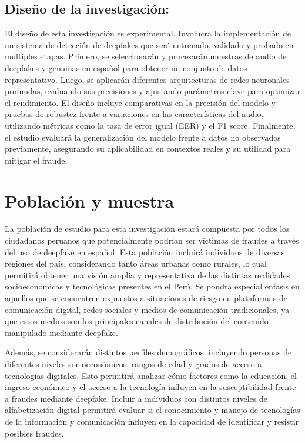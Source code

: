 \subsection{Diseño de la investigación:}
El diseño de esta investigación es experimental. Involucra la implementación de un sistema de detección de deepfakes que será entrenado, validado y probado en múltiples etapas. Primero, se seleccionarán y procesarán muestras de audio de deepfakes y genuinas en español para obtener un conjunto de datos representativo. Luego, se aplicarán diferentes arquitecturas de redes neuronales profundas, evaluando sus precisiones y ajustando parámetros clave para optimizar el rendimiento. El diseño incluye comparativas en la precisión del modelo y pruebas de robustez frente a variaciones en las características del audio, utilizando métricas como la tasa de error igual (EER) y el F1 score. Finalmente, el estudio evaluará la generalización del modelo frente a datos no observados previamente, asegurando su aplicabilidad en contextos reales y su utilidad para mitigar el fraude.

\section{Población y muestra}

La población de estudio para esta investigación estará compuesta por todos los ciudadanos peruanos que potencialmente podrían ser víctimas de fraudes a través del uso de deepfake en español. Esta población incluirá individuos de diversas regiones del país, considerando tanto áreas urbanas como rurales, lo cual permitirá obtener una visión amplia y representativa de las distintas realidades socioeconómicas y tecnológicas presentes en el Perú. Se pondrá especial énfasis en aquellos que se encuentren expuestos a situaciones de riesgo en plataformas de comunicación digital, redes sociales y medios de comunicación tradicionales, ya que estos medios son los principales canales de distribución del contenido manipulado mediante deepfake.

Además, se considerarán distintos perfiles demográficos, incluyendo personas de diferentes niveles socioeconómicos, rangos de edad y grados de acceso a tecnologías digitales. Esto permitirá analizar cómo factores como la educación, el ingreso económico y el acceso a la tecnología influyen en la susceptibilidad frente a fraudes mediante deepfake. Incluir a individuos con distintos niveles de alfabetización digital permitirá evaluar si el conocimiento y manejo de tecnologías de la información y comunicación influyen en la capacidad de identificar y resistir posibles fraudes.

